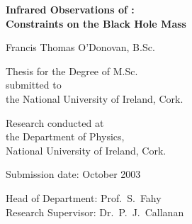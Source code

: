 \thispagestyle{empty}


\begin{center}


\textbf{Infrared Observations of \groj:\\ Constraints on the Black Hole Mass}

\vspace{15mm}

Francis Thomas O'Donovan, B.Sc.

\vspace{35mm}


Thesis for the Degree of M.Sc.\\
\vspace{5mm}
submitted to \\
\vspace{5mm}
the National University of Ireland, Cork.

\vspace{20mm}

Research conducted at \\
\vspace{5mm}
the Department of Physics, \\
\vspace{5mm}
National University of Ireland, Cork.

\vspace{30mm}

Submission date: October 2003

\vspace{15mm}


Head of Department: Prof.~S.~Fahy\\
\vspace{5mm}
Research Supervisor: Dr.~P.~J.~Callanan

\end{center}
